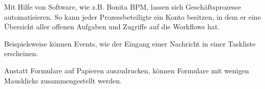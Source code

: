 Mit Hilfe von Software, wie z.B. Bonita BPM, lassen sich Geschäftsprozesse
automatisieren. So kann jeder Prozessbeteiligte ein Konto
besitzen, in dem er eine Übersicht aller offenen Aufgaben und
Zugriffe auf die Workflows hat.

Beispielsweise können Events, wie der Eingang einer Nachricht in einer Taskliste
erscheinen.

\begin{figure}[H]
\begin{minipage}{\linewidth}
\begin{center}
\end{center}
\end{minipage}
\end{figure}


Anstatt Formulare auf Papieren auszudrucken, können Formulare mit wenigen
Mausklicks zusammengestellt werden.

\begin{figure}[H]
\begin{minipage}{\linewidth}
\begin{center}
\end{center}
\end{minipage}
\end{figure}

